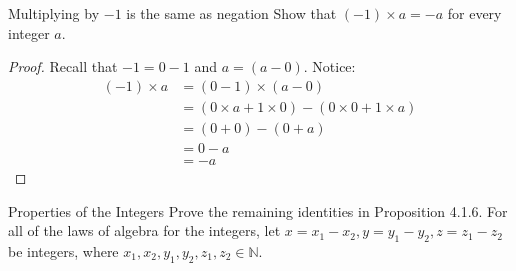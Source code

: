 \begin{problem}{Multiplying by $-1$ is the same as negation}
	Show that $(-1) \times a = -a$ for every integer $a$.
\end{problem}
\begin{proof}
	Recall that $-1 = 0 \minus 1$ and $a = (a \minus 0).$ Notice:
	\begin{align*}
		(-1) \times a &= (0 \minus 1) \times (a \minus 0) \\
		&= (0 \times a + 1 \times 0) \minus (0 \times 0 + 1 \times a) \\
		&= (0 + 0) \minus (0 + a) \\\
		&= 0 \minus a \\
		&= -a
	\end{align*}
\end{proof}

\break
\begin{problem}{Properties of the Integers}
	Prove the remaining identities in Proposition 4.1.6. For all of the laws of algebra for the integers, 
	let $x = x_1 \minus x_2, y = y_1 \minus y_2, z = z_1 \minus z_2$ be integers, where $x_1, x_2, y_1, y_2, z_1, z_2 \in \mathbb{N}.$
\end{problem}

